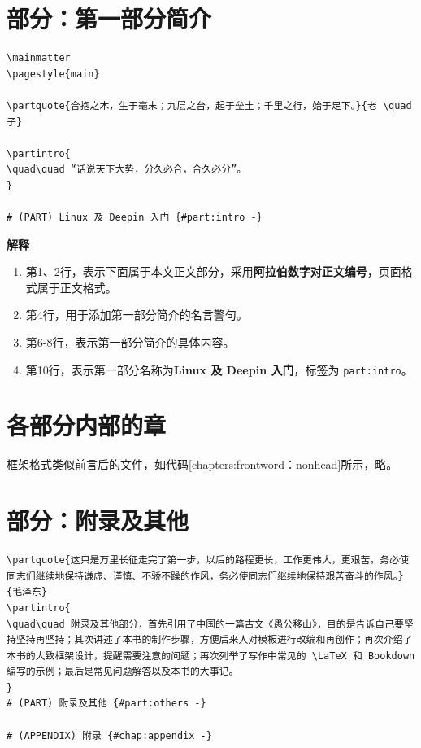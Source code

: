 \documentclass[doctor,openright,twoside]{sjtuthesis}
\newif\ifusepartquote
\newcommand{\thepartquote}{}
\newcommand{\thepartquoteauthor}{}
\newcommand{\partquote}[2]{\ifusepartquote\renewcommand{\thepartquote}{#1}\renewcommand{\thepartquoteauthor}{#2}\fi}
\newif\ifusepartintro
\newcommand{\thepartintro}{}
\newcommand{\partintro}[1]{\ifusepartintro\renewcommand{\thepartintro}{#1}\fi}
\providecommand{\tightlist}{%
    \setlength{\itemsep}{0pt}\setlength{\parskip}{0pt}}
\newcommand{\passthrough}[1]{#1}
\theoremstyle{plain}
\theoremstyle{definition}
\theoremstyle{remark}
\theoremstyle{ocrenumbox}
\theoremstyle{plain}
\begin{document}
\section{部分：第一部分简介}

\begin{lstlisting}[caption=第一部分简介示例, label={sec:mainpage:firstparthead}]
\mainmatter
\pagestyle{main}

\partquote{合抱之木，生于毫末；九层之台，起于垒土；千里之行，始于足下。}{老 \quad 子}

\partintro{
\quad\quad “话说天下大势，分久必合，合久必分”。
}

# (PART) Linux 及 Deepin 入门 {#part:intro -}
\end{lstlisting}

\textbf{解释}

\begin{enumerate}
\def\labelenumi{\arabic{enumi}.}
\tightlist
\item
  第1、2行，表示下面属于本文正文部分，采用\textbf{阿拉伯数字对正文编号}，页面格式属于正文格式。
\item
  第4行，用于添加第一部分简介的名言警句。
\item
  第6-8行，表示第一部分简介的具体内容。
\item
  第10行，表示第一部分名称为\textbf{Linux 及 Deepin 入门}，标签为
  \passthrough{\lstinline!part:intro!}。
\end{enumerate}

\section{各部分内部的章}

框架格式类似前言后的文件，如代码\ref{chapters:frontword：nonhead}所示，略。

\section{部分：附录及其他}

\begin{lstlisting}[caption=附录及其他部分框架示例, label={sec:appendix:head}]
\partquote{这只是万里长征走完了第一步，以后的路程更长，工作更伟大，更艰苦。务必使同志们继续地保持谦虚、谨慎、不骄不躁的作风，务必使同志们继续地保持艰苦奋斗的作风。}{毛泽东}
\partintro{
\quad\quad 附录及其他部分，首先引用了中国的一篇古文《愚公移山》，目的是告诉自己要坚持坚持再坚持；其次讲述了本书的制作步骤，方便后来人对模板进行改编和再创作；再次介绍了本书的大致框架设计，提醒需要注意的问题；再次列举了写作中常见的 \LaTeX 和 Bookdown 编写的示例；最后是常见问题解答以及本书的大事记。
}
# (PART) 附录及其他 {#part:others -}

# (APPENDIX) 附录 {#chap:appendix -} 
\end{lstlisting}
\end{document}
